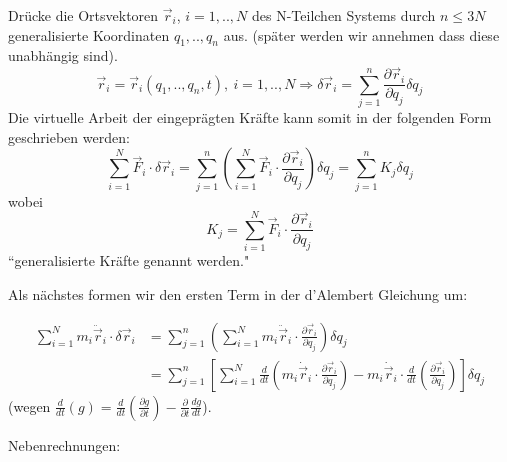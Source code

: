 \documentclass[10pt, letterpaper]{article}
\begin{document}
Drücke die Ortsvektoren $\vec{r}_i$, $i=1,..,N$ des N-Teilchen Systems durch $n \leq 3N$ generalisierte Koordinaten $q_1,..,q_n$ aus.
(später werden wir annehmen dass diese unabhängig sind).
$$\vec{r}_i = \vec{r}_i(q_1,..,q_n,t),\ i=1,..,N \Rightarrow \delta\vec{r}_i = \sum_{j=1}^n \frac{\partial\vec{r}_i}{\partial q_j}\delta q_j$$
Die virtuelle Arbeit der eingeprägten Kräfte kann somit in der folgenden Form geschrieben werden:
$$\sum_{i=1}^N \vec{F}_i\cdot\delta\vec{r}_i = \sum_{j=1}^n\left(\sum_{i=1}^N \vec{F}_i\cdot\frac{\partial\vec{r}_i}{\partial q_j}\right)\delta q_j = \sum_{j=1}^n K_j\delta q_j$$
wobei
$$K_j = \sum_{i=1}^N \vec{F}_i\cdot\frac{\partial\vec{r}_i}{\partial q_j}$$ 
``generalisierte Kräfte genannt werden."


Als nächstes formen wir den ersten Term in der d'Alembert Gleichung um:

\begin{align*}
\sum_{i=1}^N m_i\ddot{\vec{r}}_i \cdot \delta\vec{r}_i 
&= \sum_{j=1}^n \left( \sum_{i=1}^N m_i \ddot{\vec{r}}_i \cdot \frac{\partial \vec{r}_i}{\partial q_j} \right) \delta q_j \\
&= \sum_{j=1}^n \left[ \sum_{i=1}^N \frac{d}{dt} \left( m_i \dot{\vec{r}}_i \cdot \frac{\partial \vec{r}_i}{\partial q_j} \right)
    - m_i \dot{\vec{r}}_i \cdot \frac{d}{dt} \left( \frac{\partial \vec{r}_i}{\partial q_j} \right) \right] \delta q_j
\end{align*}
(wegen $\frac{d}{dt}(g) = \frac{d}{dt}(\frac{\partial g}{\partial t}) - \frac{\partial}{\partial t}\frac{dg}{dt}$).


Nebenrechnungen:
\end{document}

